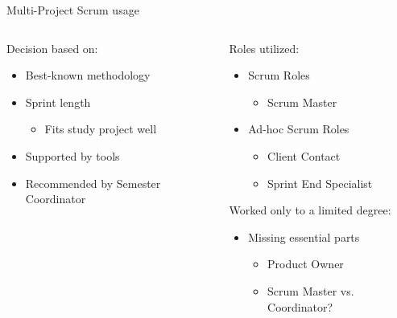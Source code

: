 \begin{frame}{Multi-Project Scrum usage}
  \begin{columns}
  		\begin{column}{0.5\textwidth}
  			Decision based on:
  			\begin{itemize}
      		\item Best-known methodology
      		\item Sprint length
        		\begin{itemize}
        		\item Fits study project well
        		\end{itemize}
      		\item Supported by tools
      		\item Recommended by Semester Coordinator
        \end{itemize}
  		\end{column}
  		
  		\pause
  		
  		\begin{column}{0.5\textwidth}
        Roles utilized:	
  	    \begin{itemize}
      	  \item Scrum Roles
        	  \begin{itemize}
        	    \item Scrum Master
        	  \end{itemize}
      		\item Ad-hoc Scrum Roles
        		\begin{itemize}
  	      		\item Client Contact
  	      		\item Sprint End Specialist
        		\end{itemize}
      	\end{itemize}
      	\pause
  	    \linespace
  			Worked only to a limited degree:
  			\begin{itemize}
  				\item Missing essential parts
    				\begin{itemize}
    				\item Product Owner
    				\item Scrum Master vs. Coordinator?
    				\end{itemize}
  			\end{itemize}
  		\end{column}
  \end{columns}
\end{frame}

